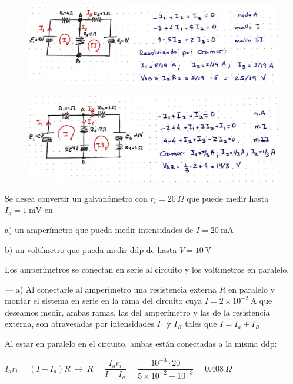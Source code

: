 \begin{figure}[H]
	\centering
	\includegraphics[width=1\textwidth]{imagenes/imagenes25/T25IM10.png}
\end{figure}

\begin{figure}[H]
	\centering
	\includegraphics[width=1\textwidth]{imagenes/imagenes25/T25IM11.png}
\end{figure}


\begin{prob}
Se desea convertir un galvanómetro con $r_i=20\ \Omega$ que puede medir hasta $I_a=1\ \mathrm{mV}$ en

a) un amperímetro que pueda medir intensidades de $I=20\ \mathrm{mA}$

b) un voltímetro que pueda medir ddp de hasta $V=10\ \mathrm{V}$
\end{prob}

Los amperímetros se conectan en serie al circuito y los voltímetros en paralelo.

--- a) Al conectarle al amperímetro una resistencia externa $R$ en paralelo y montar el sistema en serie en  la rama del circuito cuya $I=2\times 10^{-2} \ \mathrm{A}$ que deseamos medir, ambas ramas, las del amperímetro y las de la resistencia externa, son atravesadas por intensidades $I_1 \text{ y } I_R$ tales que $I=I_a+I_R$

Al estar en paralelo en el circuito, ambas están conectadas a la misma ddp:

$I_a r_i =(I-I_a) R \ \to \ R=\dfrac{I_a r_i}{I-I_a}=\dfrac{10^{-3} \cdot 20}{5\times 10^{-2}-10^{-3}}=0.408\ \Omega$

